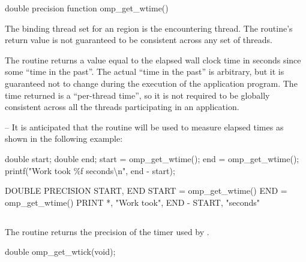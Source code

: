 \fortranspecificstart
\begin{boxedcode}
double precision function omp\_get\_wtime()
\end{boxedcode}
\fortranspecificend

\binding
The binding thread set for an  region is the encountering thread. The 
routine’s return value is not guaranteed to be consistent across any set of threads.

\effect
The  routine returns a value equal to the elapsed wall clock time in 
seconds since some ``time in the past''. The actual ``time in the past'' is arbitrary, but it is 
guaranteed not to change during the execution of the application program. The time 
returned is a ``per-thread time'', so it is not required to be globally consistent across all 
the threads participating in an application.

\notestart
\noteheader – It is anticipated that the routine will be used to measure elapsed times as shown 
in the following example:

\ccppspecificstart
\begin{boxedcode}
double start;
double end;
start = omp\_get\_wtime();
end = omp\_get\_wtime();
printf("Work took \%f seconds{\textbackslash}n", end - start);
\end{boxedcode}
\ccppspecificend

\fortranspecificstart
\begin{boxedcode}
DOUBLE PRECISION START, END
START = omp\_get\_wtime()
END = omp\_get\_wtime()
PRINT *, "Work took", END - START, "seconds"
\end{boxedcode}
\fortranspecificend
\noteend










\pagebreak
\subsection{}
\label{subsec:omp_get_wtick}
\summary
The  routine returns the precision of the timer used by 
.

\format
\ccppspecificstart
\begin{boxedcode}
double omp\_get\_wtick(void);
\end{boxedcode}
\ccppspecificend

